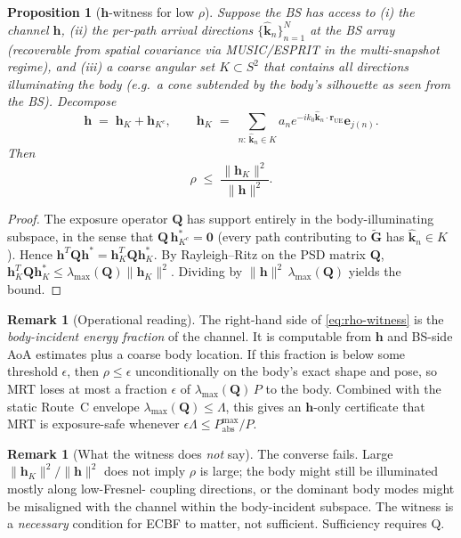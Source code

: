 \documentclass[11pt,a4paper]{article}
\newtheorem{proposition}[theorem]{Proposition}
\theoremstyle{definition}
\newtheorem{remark}[theorem]{Remark}
\newcommand{\rr}{\mathbf{r}}
\newcommand{\hh}{\mathbf{h}}
\newcommand{\kh}{\hat{\mathbf{k}}}
\newcommand{\Q}{\mathbf{Q}}
\newcommand{\Gt}{\tilde{\mathbf{G}}}
\newcommand{\lammax}{\lambda_{\max}}
\begin{document}
\begin{proposition}[\texorpdfstring{$\hh$}{h}-witness for low \texorpdfstring{$\rho$}{rho}]
\label{prop:rho-witness}
Suppose the BS has access to (i) the channel $\hh$, (ii) the per-path
arrival directions $\{\kh_n\}_{n=1}^N$ at the BS array (recoverable
from spatial covariance via MUSIC/ESPRIT in the multi-snapshot regime),
and (iii) a coarse angular set $K\subset S^2$ that contains all
directions illuminating the body (e.g.\ a cone subtended by the body's
silhouette as seen from the BS). Decompose
\[
  \hh \;=\; \hh_K + \hh_{K^c},
  \qquad
  \hh_K \;=\; \sum_{n:\,\kh_n\in K} a_n e^{-ik_0\kh_n\cdot\rr_{\mathrm{UE}}}\mathbf{e}_{j(n)}.
\]
Then
\begin{equation}
  \rho \;\le\; \frac{\|\hh_K\|^2}{\|\hh\|^2}.
  \label{eq:rho-witness}
\end{equation}
\end{proposition}

\begin{proof}
The exposure operator $\Q$ has support entirely in the body-illuminating
subspace, in the sense that $\Q\,\hh_{K^c}^* = \mathbf{0}$ (every path
contributing to $\Gt$ has $\kh_n\in K$). Hence
$\hh^T\Q\hh^* = \hh_K^T\Q\hh_K^*$. By Rayleigh--Ritz on the PSD
matrix $\Q$, $\hh_K^T\Q\hh_K^*\le\lammax(\Q)\|\hh_K\|^2$.
Dividing by $\|\hh\|^2\,\lammax(\Q)$ yields the bound.
\end{proof}

\begin{remark}[Operational reading]
\label{rem:operational}
The right-hand side of \eqref{eq:rho-witness} is the
\emph{body-incident energy fraction} of the channel. It is computable
from $\hh$ and BS-side AoA estimates plus a coarse body location. If
this fraction is below some threshold $\epsilon$, then $\rho\le\epsilon$
unconditionally on the body's exact shape and pose, so MRT loses at most
a fraction $\epsilon$ of $\lammax(\Q)\,P$ to the body. Combined with
the static Route~C envelope $\lammax(\Q)\le\Lambda$, this gives an
$\hh$-only certificate that MRT is exposure-safe whenever
$\epsilon\Lambda\le P_{\mathrm{abs}}^{\max}/P$.
\end{remark}

\begin{remark}[What the witness does \emph{not} say]
The converse fails. Large $\|\hh_K\|^2/\|\hh\|^2$ does not imply $\rho$
is large; the body might still be illuminated mostly along low-Fresnel-
coupling directions, or the dominant body modes might be misaligned with
the channel within the body-incident subspace. The witness is a
\emph{necessary} condition for ECBF to matter, not sufficient. Sufficiency
requires Q.
\end{remark}
\end{document}
